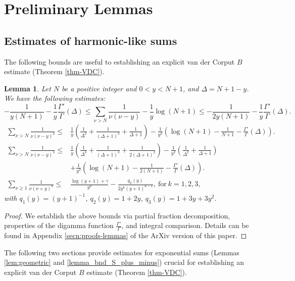 \documentclass[11pt,letterpaper,oneside,reqno]{amsart}
\renewcommand{\^}[1]{\widehat{#1}}
\numberwithin{equation}{section}
\newtheorem{lemma}[theorem]{Lemma}
\theoremstyle{remark}
\begin{document}
\section{Preliminary Lemmas}\label{secn:prel-lemmas}

\subsection{Estimates of harmonic-like sums}
%
The following bounds are useful to establishing an explicit van der Corput $B$ estimate (Theorem \ref{thm-VDC}).
%
\begin{lemma} \label{lem:harmonic-lead}
Let $N$ be a positive integer and $0<y<N+1$, and $\Delta=N+1-y$. We have the following estimates:
   \begin{equation}
\label{bnd-sum-nu(nu-y)blower-bupper}
-  \frac1{y(N+1)} 
- \frac1y \frac{\Gamma'}{\Gamma}(\Delta) \leq \sum_{\nu>N}\frac{1}{\nu(\nu-y)} - \frac1y  \log(N+1)
%
\leq 
  - \frac1{2y(N+1)} - \frac1y\frac{\Gamma'}{\Gamma}(\Delta). 
\end{equation}
%
\begin{align}
\label{bnd-sum-nu(nu-y)^2bupper}
 \sum_{\nu>N} \frac{1}{\nu(\nu-y)^2} 
 \le& \frac{1}{y} \left( \frac{1}{\Delta^2} + \frac{1}{(\Delta+1)^2} + \frac{1}{\Delta+1} \right)  - \frac{1}{y^2} \left( \log(N+1) - \frac{1}{N+1} - \frac{\Gamma'}{\Gamma}(\Delta) \right).  \\
 \label{bnd-sum-nu(nu-y)^3bupper}
 \sum_{\nu>N} \frac{1}{\nu(\nu-y)^3} 
 \leq & \frac{1}{y} \left( \frac{1}{\Delta^3} + \frac{1}{(\Delta+1)^3} + \frac{1}{2(\Delta+1)^2} \right) 
 - \frac{1}{y^2} \left( \frac{1}{\Delta^2} + \frac{1}{\Delta+1} \right) 
 \nonumber \\
 & + \frac{1}{y^3} \left( \log(N+1) - \frac{1}{2(N+1)} - \frac{\Gamma'}{\Gamma}(\Delta) \right). \\
 \sum_{\nu\ge1} \frac{1}{\nu(\nu+y)^k} \leq & \frac{\log(y+1) + \gamma}{y^k} - \frac{q_k(y)}{2y^k(y+1)^{k-1}} \label{eq:sum_infty_power_k} ,\ \text{for}\ k=1,2,3,
\end{align}
with
$q_1(y)=(y+1)^{-1}$, $q_2(y)=1+2y$, $q_3(y)=1+3y+3y^2$.
\end{lemma}
%

\begin{proof}
We establish the above bounds via partial fraction decomposition, properties of the digamma function $\frac{\Gamma'}{\Gamma}$, and integral comparison. 
Details can be found in Appendix \ref{secn:proofs-lemmas} of the ArXiv version of this paper. %
\end{proof}
%
The following two sections provide estimates for exponential sums (Lemmas \ref{lem:geometric} and \ref{lemma_bnd_S_plus_minus}) crucial for establishing an explicit van der Corput $B$ estimate (Theorem \ref{thm-VDC}).
%
\end{document}
